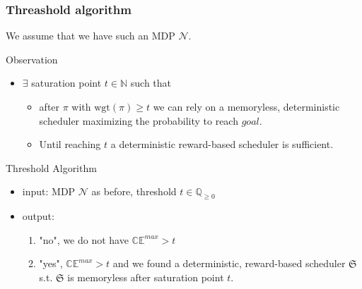 \documentclass[onlymath]{beamer}
\begin{document}
\begin{frame}
	\frametitle{Threashold algorithm}
	We assume that we have such an MDP $\mathcal{N}$. \pause
	\begin{block}{Observation}
		\begin{itemize}
			\item $\exists$ saturation point $t \in \mathbb{N}$ such that \pause
			\begin{itemize}
				\item after $\pi$ with $\mathrm{wgt}(\pi) \geq t$ we can rely on a memoryless, deterministic scheduler maximizing the probability to reach $goal$. \pause
				\item Until reaching $t$ a deterministic reward-based scheduler is sufficient.
			\end{itemize}
		\end{itemize}
	\end{block}
\pause
	\begin{block}{Threshold Algorithm}
		\begin{itemize}
			\item input: MDP $\mathcal{N}$ as before, threshold $t \in \mathbb{Q}_{\geq 0}$\pause
			\item output:\begin{enumerate}
				\item "no", we do not have $\mathbb{CE}^{max}>t$
				\item "yes", $\mathbb{CE}^{max}>t$ and we found a deterministic, reward-based scheduler $\mathfrak{S}$ s.t. \pause $\mathfrak{S}$ is memoryless after saturation point $t$.
			\end{enumerate}
		\end{itemize}
	\end{block}
\end{frame}
\end{document}
